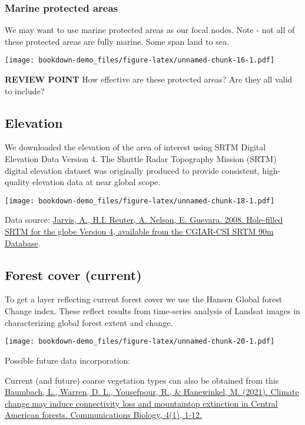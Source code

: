 \documentclass[
]{book}
\begin{document}
\hypertarget{marine-protected-areas}{%
\subsubsection{Marine protected areas}\label{marine-protected-areas}}

We may want to use marine protected areas as our focal nodes. Note - not all of these protected areas are fully marine. Some span land to sea.

\texttt{[image: bookdown-demo\_files/figure-latex/unnamed-chunk-16-1.pdf]}

\textbf{REVIEW POINT} How effective are these protected areas? Are they all valid to include?

\hypertarget{elevation}{%
\subsection{Elevation}\label{elevation}}

We downloaded the elevation of the area of interest using SRTM Digital Elevation Data Version 4. The Shuttle Radar Topography Mission (SRTM) digital elevation dataset was originally produced to provide consistent, high-quality elevation data at near global scope.

\texttt{[image: bookdown-demo\_files/figure-latex/unnamed-chunk-18-1.pdf]}

Data source: \href{https://srtm.csi.cgiar.org}{Jarvis, A., H.I. Reuter, A. Nelson, E. Guevara. 2008. Hole-filled SRTM for the globe Version 4, available from the CGIAR-CSI SRTM 90m Database}.

\hypertarget{forest-cover-current}{%
\subsection{Forest cover (current)}\label{forest-cover-current}}

To get a layer reflecting current forest cover we use the Hansen Global forest Change index. These reflect results from time-series analysis of Landsat images in characterizing global forest extent and change.

\texttt{[image: bookdown-demo\_files/figure-latex/unnamed-chunk-20-1.pdf]}

Possible future data incorporation:

Current (and future) coarse vegetation types can also be obtained from this \href{https://www.nature.com/articles/s42003-021-02359-9}{Baumbach, L., Warren, D. L., Yousefpour, R., \& Hanewinkel, M. (2021). Climate change may induce connectivity loss and mountaintop extinction in Central American forests. Communications Biology, 4(1), 1-12.}
\end{document}

